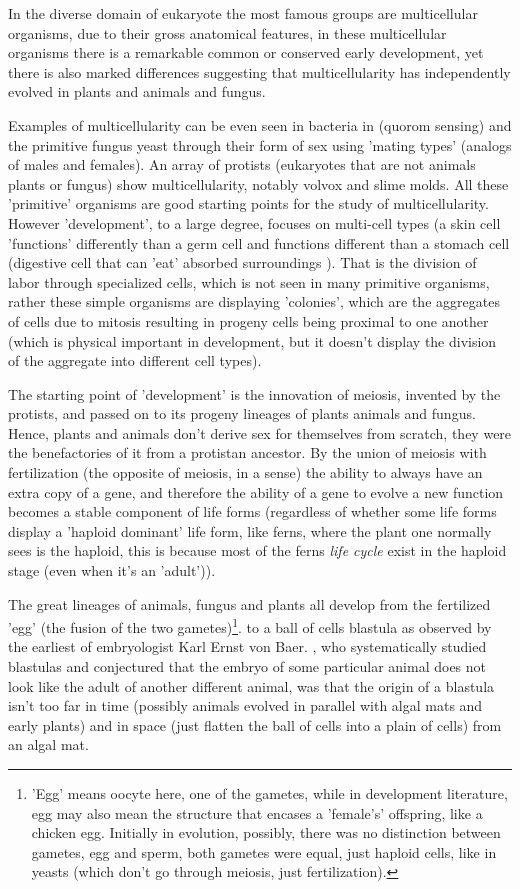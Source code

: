 In the diverse domain of eukaryote the most famous groups are multicellular organisms, due to their gross anatomical features, in these multicellular organisms there is a remarkable common or conserved early development, yet there is also marked differences suggesting that multicellularity has independently evolved in plants and animals and fungus.  

Examples of multicellularity can be even seen in bacteria in (quorom sensing) and the primitive fungus yeast through their form of sex using 'mating types' (analogs of males and females)\cite{wolpert}. An array of protists (eukaryotes that are not animals plants or fungus) show multicellularity, notably volvox and slime molds.  All these 'primitive' organisms are good starting points for the study of multicellularity.  However 'development', to a large degree, focuses on multi-cell types (a skin cell 'functions' differently than a germ cell and functions different than a stomach cell (digestive cell that can 'eat' absorbed surroundings ).  That is the division of labor through specialized cells, which is not seen in many primitive organisms, rather these simple organisms are displaying 'colonies', which are the aggregates of cells due to mitosis resulting in progeny cells being proximal to one another (which is physical important in development, but it doesn't display the division of the aggregate into different cell types).

The starting point of 'development' is the innovation of meiosis, invented by the protists, and passed on to its progeny lineages of plants animals and fungus.  Hence, plants and animals don't derive sex for themselves from scratch, they were the benefactories of it from a protistan ancestor.  By the union of meiosis with fertilization (the opposite of meiosis, in a sense) the ability to always have an extra copy of a gene, and therefore the ability of a gene to evolve a new function becomes a stable component of life forms (regardless of whether some life forms display a 'haploid dominant' life form, like ferns, where the plant one normally sees is the haploid, this is because most of the ferns \textit{life cycle} exist in the haploid stage (even when it's an 'adult')).


The great lineages of animals, fungus and plants all develop from the fertilized 'egg' (the fusion of the two gametes)\footnote{'Egg' means oocyte here, one of the gametes, while in development literature, egg may also mean the structure that encases a 'female's' offspring, like a chicken egg.  Initially in evolution, possibly, there was no distinction between gametes, egg and sperm, both gametes were equal, just haploid cells, like in yeasts (which don't go through meiosis, just fertilization).}. to a ball of cells blastula as observed by the earliest of embryologist Karl Ernst von Baer. , who systematically studied blastulas and conjectured that the embryo of some particular animal does not look like the adult of another different animal, was that the origin of a blastula isn't too far in time (possibly animals evolved in parallel with algal mats and early plants) and in space (just flatten the ball of cells into a plain of cells) from an algal mat.     



